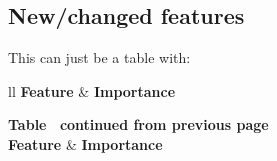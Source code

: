 \subsection{New/changed features}

This can just be a table with:

\begin{longtable}{ll}
    \hline
    \textbf{Feature}             & \textbf{Importance}          \\ \hline
    \endfirsthead

    {{\bfseries Table \thetable\ continued from previous page}} \\
    \hline
    \textbf{Feature}             & \textbf{Importance}          \\ \hline
    \endhead

    \hline {}       \\ \hline
    \endfoot

    \hline
    \endlastfoot


\end{longtable}
